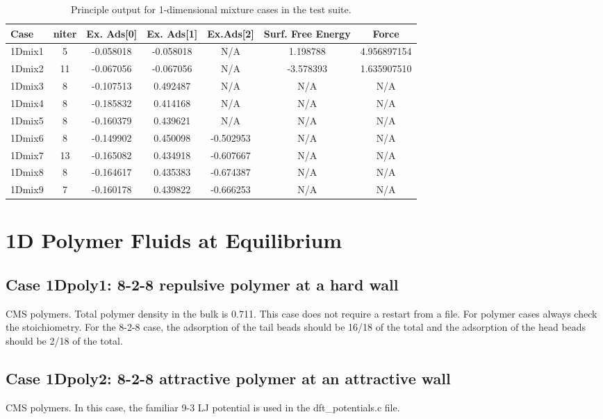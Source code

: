 \documentclass[10pt,onecolumn]{article}
\begin{document}
\begin{table}[h]
\begin{tabular}{|l|c|c|c|c|c|c|}
\hline
Case & niter & Ex. Ads[0]  & Ex. Ads[1] & Ex.Ads[2] & Surf. Free Energy & Force \\
\hline
1Dmix1 & 5 & -0.058018 & -0.058018 & N/A & 1.198788  & 4.956897154 \\
1Dmix2 & 11 & -0.067056 & -0.067056 & N/A & -3.578393  & 1.635907510 \\
1Dmix3 & 8 & -0.107513 & 0.492487 & N/A & N/A & N/A \\
1Dmix4 & 8 & -0.185832 & 0.414168 & N/A & N/A & N/A \\
1Dmix5 & 8 & -0.160379 & 0.439621 & N/A & N/A & N/A \\
1Dmix6 & 8 & -0.149902 & 0.450098 & -0.502953 & N/A & N/A \\
1Dmix7 & 13 & -0.165082 & 0.434918 & -0.607667 & N/A & N/A \\
1Dmix8 & 8 & -0.164617 & 0.435383 & -0.674387   & N/A & N/A \\
1Dmix9 & 7 & -0.160178 & 0.439822 & -0.666253   & N/A & N/A \\
\hline
\end{tabular}
\label{tab:table1}
\caption{Principle output for 1-dimensional mixture cases
in the test suite.}
\end{table}

\section{1D Polymer Fluids at Equilibrium}

\subsection{Case 1Dpoly1: 8-2-8 repulsive polymer at a hard wall}
CMS polymers. Total polymer density in the bulk is 0.711.  This case does not require a restart from a file.
For polymer cases always check the stoichiometry.  For the 8-2-8 case, the adsorption of the tail beads should be 16/18 of the total and the adsorption of the head beads should be 2/18 of the total.

\subsection{Case 1Dpoly2: 8-2-8 attractive polymer at an attractive wall}
CMS polymers. In this case, the familiar 9-3 LJ potential is used in the dft\_potentials.c file.
\end{document}
